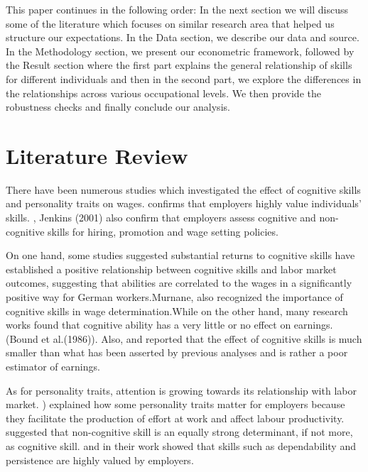 \documentclass[11pt, a4paper, leqno]{article}
\begin{document}
This paper continues in the following order: In the next section we will discuss some of the literature which focuses on similar research area that helped us structure our expectations. In the Data section, we describe our data and source. In the Methodology section, we present our econometric framework, followed by the Result section where the first part explains the general relationship of skills for different individuals and then in the second part, we explore the differences in the relationships across various occupational levels. We then provide the robustness checks and finally conclude our analysis.

\section*{Literature Review}

There have been numerous studies which investigated the effect of cognitive skills and personality traits on wages.\citet{eineck} confirms that employers highly value individuals’ skills. \citet{farkas}, Jenkins (2001) also confirm that employers assess cognitive and non-cognitive skills for hiring, promotion and wage setting policies.\par

On one hand, some studies suggested substantial returns to cognitive skills \citet{heineck} have established a positive relationship between cognitive skills and labor market outcomes, suggesting that abilities are correlated to the
wages in a significantly positive way for German workers.Murnane, \citet{levy} also recognized the importance of cognitive skills in wage determination.While on the other hand, many research works found that cognitive ability has a very little  or no effect on earnings.(Bound et al.(1986)). Also, \citet{heckman} and  \citet{zax} reported that the effect of cognitive skills is much smaller than what has been asserted by previous analyses and is rather a poor estimator of earnings.\par

As for personality traits, attention is growing towards its relationship with labor market. \citet{Osbornw}) explained how some personality traits matter for employers because they facilitate the production of effort at work and affect labour productivity. 
\citet{Urzua} suggested that non-cognitive skill is an equally strong determinant, if not more, as cognitive skill. \citet{Gintis} and \citet{Edwards} in their work showed that skills such as dependability and persistence are highly valued by employers.\par
\end{document}
